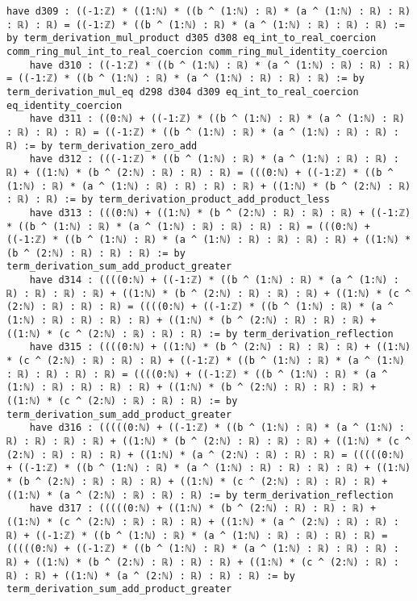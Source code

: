 \documentclass{article}
\begin{document}
\begin{tcolorbox}[colback=white!10, width=\linewidth]
\begin{lstlisting}[language=Lean4]
    have d309 : ((-1:ℤ) * ((1:ℕ) * ((b ^ (1:ℕ) : ℝ) * (a ^ (1:ℕ) : ℝ) : ℝ) : ℝ) : ℝ) = ((-1:ℤ) * ((b ^ (1:ℕ) : ℝ) * (a ^ (1:ℕ) : ℝ) : ℝ) : ℝ) := by term_derivation_mul_product d305 d308 eq_int_to_real_coercion comm_ring_mul_int_to_real_coercion comm_ring_mul_identity_coercion
    have d310 : ((-1:ℤ) * ((b ^ (1:ℕ) : ℝ) * (a ^ (1:ℕ) : ℝ) : ℝ) : ℝ) = ((-1:ℤ) * ((b ^ (1:ℕ) : ℝ) * (a ^ (1:ℕ) : ℝ) : ℝ) : ℝ) := by term_derivation_mul_eq d298 d304 d309 eq_int_to_real_coercion eq_identity_coercion
    have d311 : ((0:ℕ) + ((-1:ℤ) * ((b ^ (1:ℕ) : ℝ) * (a ^ (1:ℕ) : ℝ) : ℝ) : ℝ) : ℝ) = ((-1:ℤ) * ((b ^ (1:ℕ) : ℝ) * (a ^ (1:ℕ) : ℝ) : ℝ) : ℝ) := by term_derivation_zero_add
    have d312 : (((-1:ℤ) * ((b ^ (1:ℕ) : ℝ) * (a ^ (1:ℕ) : ℝ) : ℝ) : ℝ) + ((1:ℕ) * (b ^ (2:ℕ) : ℝ) : ℝ) : ℝ) = (((0:ℕ) + ((-1:ℤ) * ((b ^ (1:ℕ) : ℝ) * (a ^ (1:ℕ) : ℝ) : ℝ) : ℝ) : ℝ) + ((1:ℕ) * (b ^ (2:ℕ) : ℝ) : ℝ) : ℝ) := by term_derivation_product_add_product_less
    have d313 : (((0:ℕ) + ((1:ℕ) * (b ^ (2:ℕ) : ℝ) : ℝ) : ℝ) + ((-1:ℤ) * ((b ^ (1:ℕ) : ℝ) * (a ^ (1:ℕ) : ℝ) : ℝ) : ℝ) : ℝ) = (((0:ℕ) + ((-1:ℤ) * ((b ^ (1:ℕ) : ℝ) * (a ^ (1:ℕ) : ℝ) : ℝ) : ℝ) : ℝ) + ((1:ℕ) * (b ^ (2:ℕ) : ℝ) : ℝ) : ℝ) := by term_derivation_sum_add_product_greater
    have d314 : ((((0:ℕ) + ((-1:ℤ) * ((b ^ (1:ℕ) : ℝ) * (a ^ (1:ℕ) : ℝ) : ℝ) : ℝ) : ℝ) + ((1:ℕ) * (b ^ (2:ℕ) : ℝ) : ℝ) : ℝ) + ((1:ℕ) * (c ^ (2:ℕ) : ℝ) : ℝ) : ℝ) = ((((0:ℕ) + ((-1:ℤ) * ((b ^ (1:ℕ) : ℝ) * (a ^ (1:ℕ) : ℝ) : ℝ) : ℝ) : ℝ) + ((1:ℕ) * (b ^ (2:ℕ) : ℝ) : ℝ) : ℝ) + ((1:ℕ) * (c ^ (2:ℕ) : ℝ) : ℝ) : ℝ) := by term_derivation_reflection
    have d315 : ((((0:ℕ) + ((1:ℕ) * (b ^ (2:ℕ) : ℝ) : ℝ) : ℝ) + ((1:ℕ) * (c ^ (2:ℕ) : ℝ) : ℝ) : ℝ) + ((-1:ℤ) * ((b ^ (1:ℕ) : ℝ) * (a ^ (1:ℕ) : ℝ) : ℝ) : ℝ) : ℝ) = ((((0:ℕ) + ((-1:ℤ) * ((b ^ (1:ℕ) : ℝ) * (a ^ (1:ℕ) : ℝ) : ℝ) : ℝ) : ℝ) + ((1:ℕ) * (b ^ (2:ℕ) : ℝ) : ℝ) : ℝ) + ((1:ℕ) * (c ^ (2:ℕ) : ℝ) : ℝ) : ℝ) := by term_derivation_sum_add_product_greater
    have d316 : (((((0:ℕ) + ((-1:ℤ) * ((b ^ (1:ℕ) : ℝ) * (a ^ (1:ℕ) : ℝ) : ℝ) : ℝ) : ℝ) + ((1:ℕ) * (b ^ (2:ℕ) : ℝ) : ℝ) : ℝ) + ((1:ℕ) * (c ^ (2:ℕ) : ℝ) : ℝ) : ℝ) + ((1:ℕ) * (a ^ (2:ℕ) : ℝ) : ℝ) : ℝ) = (((((0:ℕ) + ((-1:ℤ) * ((b ^ (1:ℕ) : ℝ) * (a ^ (1:ℕ) : ℝ) : ℝ) : ℝ) : ℝ) + ((1:ℕ) * (b ^ (2:ℕ) : ℝ) : ℝ) : ℝ) + ((1:ℕ) * (c ^ (2:ℕ) : ℝ) : ℝ) : ℝ) + ((1:ℕ) * (a ^ (2:ℕ) : ℝ) : ℝ) : ℝ) := by term_derivation_reflection
    have d317 : (((((0:ℕ) + ((1:ℕ) * (b ^ (2:ℕ) : ℝ) : ℝ) : ℝ) + ((1:ℕ) * (c ^ (2:ℕ) : ℝ) : ℝ) : ℝ) + ((1:ℕ) * (a ^ (2:ℕ) : ℝ) : ℝ) : ℝ) + ((-1:ℤ) * ((b ^ (1:ℕ) : ℝ) * (a ^ (1:ℕ) : ℝ) : ℝ) : ℝ) : ℝ) = (((((0:ℕ) + ((-1:ℤ) * ((b ^ (1:ℕ) : ℝ) * (a ^ (1:ℕ) : ℝ) : ℝ) : ℝ) : ℝ) + ((1:ℕ) * (b ^ (2:ℕ) : ℝ) : ℝ) : ℝ) + ((1:ℕ) * (c ^ (2:ℕ) : ℝ) : ℝ) : ℝ) + ((1:ℕ) * (a ^ (2:ℕ) : ℝ) : ℝ) : ℝ) := by term_derivation_sum_add_product_greater

\end{lstlisting}
\end{tcolorbox}
\end{document}
